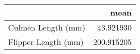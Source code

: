 \begin{tabular}{lr}
\toprule
{} &        mean \\
\midrule
Culmen Length (mm)  &   43.921930 \\
Flipper Length (mm) &  200.915205 \\
\bottomrule
\end{tabular}
